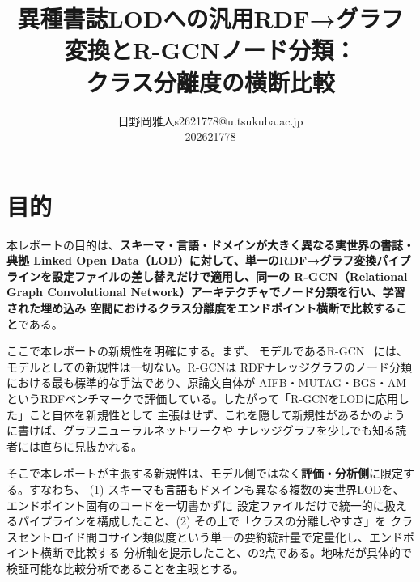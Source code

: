 \documentclass[dvipdfmx,twoside,11pt]{article}
\makeatletter
\newcommand\studentName{日野岡雅人}                  %
\newcommand\studentEmail{s2621778@u.tsukuba.ac.jp}          %
\newcommand\studentNumber{202621778}                %
\newcommand{\repourl}{\href{https://github.com/terasaki-8910/MLPR_final_report.git}{{\ttfamily\scriptsize https://github.com/terasaki-8910/MLPR\_final\_report.git}}}
\makeatother
\begin{document}
    \title{異種書誌LODへの汎用RDF→グラフ変換とR-GCNノード分類：\\クラス分離度の横断比較}

    \author{\name \studentName \email \studentEmail \\
    \studentNumber
    \addr
    }


    \maketitle

\makeatletter
\def\@oddfoot{{\repourl}\hfil{\rm\thepage}}%
\def\@evenfoot{{\rm\thepage}\hfil{\repourl}}%
\makeatother

\section{目的}
\label{sec:purpose}

本レポートの目的は、\textbf{スキーマ・言語・ドメインが大きく異なる実世界の書誌・典拠 Linked Open
Data（LOD）に対して、単一のRDF→グラフ変換パイプラインを設定ファイルの差し替えだけで適用し、同一の
R-GCN（Relational Graph Convolutional Network）アーキテクチャでノード分類を行い、学習された埋め込み
空間におけるクラス分離度をエンドポイント横断で比較すること}である。

ここで本レポートの新規性を明確にする。まず、
モデルであるR-GCN~\citep{schlichtkrull2018modeling} には、モデルとしての新規性は一切ない。R-GCNは
RDFナレッジグラフのノード分類における最も標準的な手法であり、原論文自体が AIFB・MUTAG・BGS・AM
というRDFベンチマークで評価している。したがって「R-GCNをLODに応用した」こと自体を新規性として
主張はせず、これを隠して新規性があるかのように書けば、グラフニューラルネットワークや
ナレッジグラフを少しでも知る読者には直ちに見抜かれる。

そこで本レポートが主張する新規性は、モデル側ではなく\textbf{評価・分析側}に限定する。すなわち、
(1) スキーマも言語もドメインも異なる複数の実世界LODを、エンドポイント固有のコードを一切書かずに
設定ファイルだけで統一的に扱えるパイプラインを構成したこと、(2) その上で「クラスの分離しやすさ」を
クラスセントロイド間コサイン類似度という単一の要約統計量で定量化し、エンドポイント横断で比較する
分析軸を提示したこと、の2点である。地味だが具体的で検証可能な比較分析であることを主眼とする。
\end{document}

